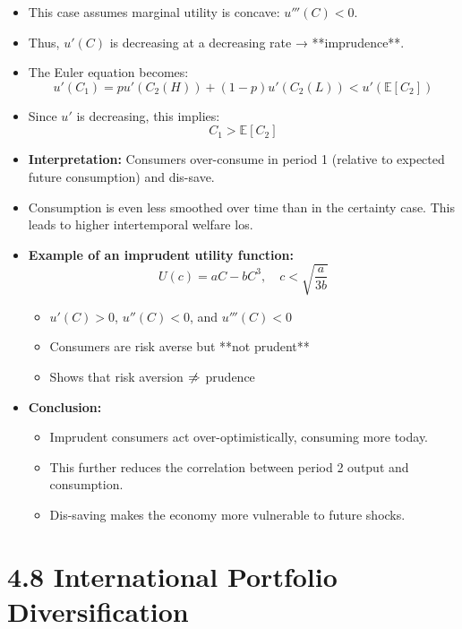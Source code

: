 \documentclass[12pt]{article}
\begin{document}
\begin{itemize}
    \item This case assumes marginal utility is concave: $u'''(C) < 0$.
    \item Thus, $u'(C)$ is decreasing at a decreasing rate → **imprudence**.
    
    \item The Euler equation becomes:
    \[
    u'(C_1) = pu'(C_2(H)) + (1 - p)u'(C_2(L)) < u'(\mathbb{E}[C_2])
    \]
    
    \item Since $u'$ is decreasing, this implies:
    \[
    C_1 > \mathbb{E}[C_2]
    \]
    
    \item \textbf{Interpretation:} Consumers over-consume in period 1 (relative to expected future consumption) and dis-save.
    
    \item Consumption is even less smoothed over time than in the certainty case. This leads to higher intertemporal welfare los.

    \item \textbf{Example of an imprudent utility function:}
    \[
    U(c) = aC - bC^3, \quad c < \sqrt{\frac{a}{3b}}
    \]
    
    \begin{itemize}
        \item $u'(C) > 0$, $u''(C) < 0$, and $u'''(C) < 0$
        \item Consumers are risk averse but **not prudent**
        \item Shows that risk aversion $\centernot\Rightarrow$ prudence
    \end{itemize}
    
    \item \textbf{Conclusion:}
    \begin{itemize}
        \item Imprudent consumers act over-optimistically, consuming more today.
        \item This further reduces the correlation between period 2 output and consumption.
        \item Dis-saving makes the economy more vulnerable to future shocks.
    \end{itemize}
\end{itemize}

\section*{\noindent\textbf{4.8 International Portfolio Diversification}}
\end{document}
